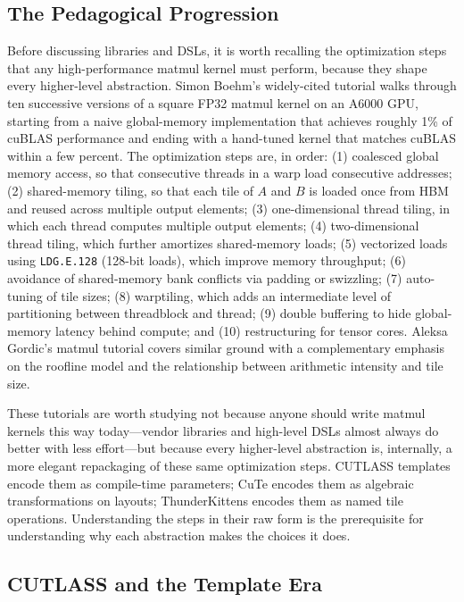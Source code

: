 \documentclass[10pt]{article}
\begin{document}
\subsection{The Pedagogical Progression}
\label{sec:matmul-pedagogy}

Before discussing libraries and DSLs, it is worth recalling the optimization steps that any high-performance matmul kernel must perform, because they shape every higher-level abstraction. Simon Boehm's widely-cited tutorial \citep{boehm2022cudammm} walks through ten successive versions of a square FP32 matmul kernel on an A6000 GPU, starting from a naive global-memory implementation that achieves roughly 1\% of cuBLAS performance and ending with a hand-tuned kernel that matches cuBLAS within a few percent. The optimization steps are, in order: (1) coalesced global memory access, so that consecutive threads in a warp load consecutive addresses; (2) shared-memory tiling, so that each tile of $A$ and $B$ is loaded once from HBM and reused across multiple output elements; (3) one-dimensional thread tiling, in which each thread computes multiple output elements; (4) two-dimensional thread tiling, which further amortizes shared-memory loads; (5) vectorized loads using \texttt{LDG.E.128} (128-bit loads), which improve memory throughput; (6) avoidance of shared-memory bank conflicts via padding or swizzling; (7) auto-tuning of tile sizes; (8) warptiling, which adds an intermediate level of partitioning between threadblock and thread; (9) double buffering to hide global-memory latency behind compute; and (10) restructuring for tensor cores. Aleksa Gordic's matmul tutorial \citep{gordic2024matmul} covers similar ground with a complementary emphasis on the roofline model and the relationship between arithmetic intensity and tile size.

These tutorials are worth studying not because anyone should write matmul kernels this way today---vendor libraries and high-level DSLs almost always do better with less effort---but because every higher-level abstraction is, internally, a more elegant repackaging of these same optimization steps. CUTLASS templates encode them as compile-time parameters; CuTe encodes them as algebraic transformations on layouts; ThunderKittens encodes them as named tile operations. Understanding the steps in their raw form is the prerequisite for understanding why each abstraction makes the choices it does.

\subsection{CUTLASS and the Template Era}
\label{sec:matmul-cutlass}
\end{document}
